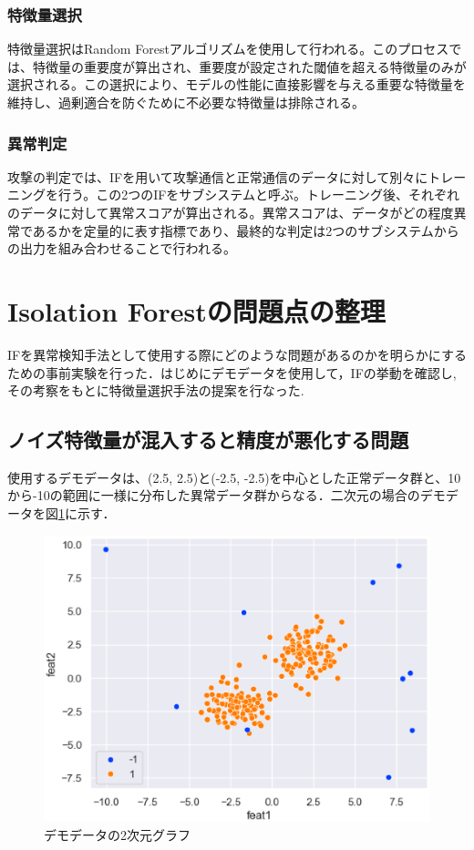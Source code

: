 \documentclass{css}
\begin{document}
\subsubsection{特徴量選択}

特徴量選択はRandom Forestアルゴリズムを使用して行われる。このプロセスでは、特徴量の重要度が算出され、重要度が設定された閾値を超える特徴量のみが選択される。この選択により、モデルの性能に直接影響を与える重要な特徴量を維持し、過剰適合を防ぐために不必要な特徴量は排除される。

\subsubsection{異常判定}

攻撃の判定では、IFを用いて攻撃通信と正常通信のデータに対して別々にトレーニングを行う。この2つのIFをサブシステムと呼ぶ。トレーニング後、それぞれのデータに対して異常スコアが算出される。異常スコアは、データがどの程度異常であるかを定量的に表す指標であり、最終的な判定は2つのサブシステムからの出力を組み合わせることで行われる。


\section{Isolation Forestの問題点の整理}
IFを異常検知手法として使用する際にどのような問題があるのかを明らかにするための事前実験を行った．はじめにデモデータを使用して，IFの挙動を確認し,その考察をもとに特徴量選択手法の提案を行なった.

\subsection{ノイズ特徴量が混入すると精度が悪化する問題}
使用するデモデータは、(2.5, 2.5)と(-2.5, -2.5)を中心とした正常データ群と、10から-10の範囲に一様に分布した異常データ群からなる．二次元の場合のデモデータを図\ref{fig:demodata}に示す．

\begin{figure}[ht]
    \centering
    \includegraphics[width=\linewidth]{pictures/eps/demodata.eps}
    \caption{デモデータの2次元グラフ}
    \label{fig:demodata}
\end{figure}
\end{document}
